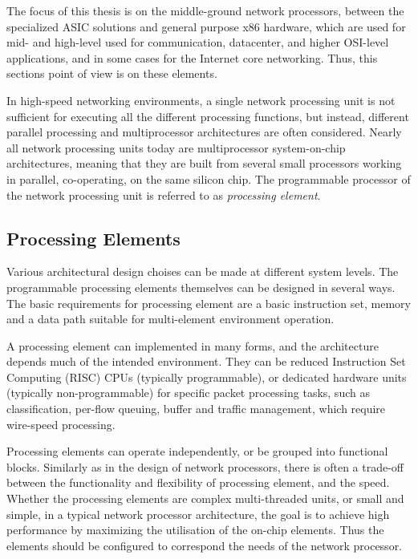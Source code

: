 The focus of this thesis is on the middle-ground network processors, between the specialized ASIC solutions and general purpose x86 hardware, which are used for mid- and high-level used for communication, datacenter, and higher OSI-level applications, and in some cases for the Internet core networking. Thus, this sections point of view is on these elements.

In high-speed networking environments, a single network processing unit is not sufficient for executing all the different processing functions, but instead, different parallel processing and multiprocessor architectures are often considered. Nearly all network processing units today are multiprocessor system-on-chip architectures, meaning that they are built from several small processors working in parallel, co-operating, on the same silicon chip. The programmable processor of the network processing unit is referred to as \emph{processing element}.~\cite{Giladi:2008:Network, Papaefstathiou:2005:Queue}

\subsection{Processing Elements}
Various architectural design choises can be made at different system levels. The programmable processing elements themselves can be designed in several ways. The basic requirements for processing element are a basic instruction set, memory and a data path suitable for multi-element environment operation.~\cite{Giladi:2008:Network}

A processing element can implemented in many forms, and the architecture depends much of the intended environment. They can be reduced Instruction Set Computing (RISC) CPUs (typically programmable), or dedicated hardware units (typically non-programmable) for specific packet processing tasks, such as classification, per-flow queuing, buffer and traffic management, which require wire-speed processing.~\cite{Giladi:2008:Network}

Processing elements can operate independently, or be grouped into functional blocks. Similarly as in the design of network processors, there is often a trade-off between the functionality and flexibility of processing element, and the speed. Whether the processing elements are complex multi-threaded units, or small and simple, in a typical network processor architecture, the goal is to achieve high performance by maximizing the utilisation of the on-chip elements. Thus the elements should be configured to correspond the needs of the network processor.~\cite{Giladi:2008:Network}

